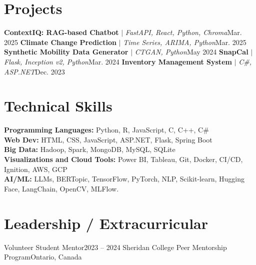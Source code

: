 \section{Projects}
  \resumeSubHeadingListStart
    \resumeProjectHeading
      {\textbf{ContextIQ: RAG-based Chatbot} $|$ \emph{FastAPI, React, Python, Chroma}}{Mar. 2025}
      \resumeItemListStart
      \resumeItemListEnd
    \resumeProjectHeading
      {\textbf{Climate Change Prediction} $|$ \emph{Time Series, ARIMA, Python}}{Mar. 2025}
      \resumeItemListStart
      \resumeItemListEnd
    \resumeProjectHeading
      {\textbf{Synthetic Mobility Data Generator} $|$ \emph{CTGAN, Python}}{May 2024}
      \resumeItemListStart
      \resumeItemListEnd
    \resumeProjectHeading
      {\textbf{SnapCal} $|$ \emph{Flask, Inception v2, Python}}{Mar. 2024}
      \resumeItemListStart
      \resumeItemListEnd
    \resumeProjectHeading
      {\textbf{Inventory Management System} $|$ \emph{C\#, ASP.NET}}{Dec. 2023}
      \resumeItemListStart
      \resumeItemListEnd
  \resumeSubHeadingListEnd

\section{Technical Skills}
 \begin{itemize}[leftmargin=0.15in, label={}]
  \small{\item{
   \textbf{Programming Languages:} Python, R, JavaScript, C, C++, C\# \\
   \textbf{Web Dev:} HTML, CSS, JavaScript, ASP.NET, Flask, Spring Boot \\
   \textbf{Big Data:} Hadoop, Spark, MongoDB, MySQL, SQLite \\
   \textbf{Visualizations and Cloud Tools:} Power BI, Tableau, Git, Docker, CI/CD, Ignition, AWS, GCP \\
   \textbf{AI/ML:} LLMs, BERTopic, TensorFlow, PyTorch, NLP, Scikit-learn, Hugging Face, LangChain, OpenCV, MLFlow.
  }}
 \end{itemize}

\section{Leadership / Extracurricular}
  \resumeSubHeadingListStart
    \resumeSubheading
      {Volunteer Student Mentor}{2023 -- 2024}
      {Sheridan College Peer Mentorship Program}{Ontario, Canada}
  \resumeSubHeadingListEnd


  
